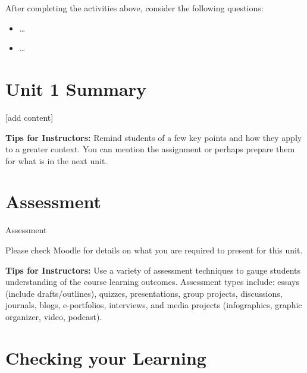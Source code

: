 \documentclass[
]{book}
\providecommand{\tightlist}{%
  \setlength{\itemsep}{0pt}\setlength{\parskip}{0pt}}
\begin{document}
After completing the activities above, consider the following questions:

\begin{itemize}
\tightlist
\item
  \ldots{}\\
\item
  \ldots{}
\end{itemize}

\hypertarget{unit-1-summary}{%
\section*{Unit 1 Summary}\label{unit-1-summary}}

{[}add content{]}

\begin{feedback}
\textbf{Tips for Instructors:}
Remind students of a few key points and how they apply to a greater context. You can mention the assignment or perhaps prepare them for what is in the next unit.
\end{feedback}

\hypertarget{assessment-3}{%
\section*{Assessment}\label{assessment-3}}

\begin{assessment}
{Assessment}

Please check Moodle for details on what you are required to present for this unit.
\end{assessment}

\begin{feedback}
\textbf{Tips for Instructors:}
Use a variety of assessment techniques to gauge students understanding of the course learning outcomes. Assessment types include: essays (include drafts/outlines), quizzes, presentations, group projects, discussions, journals, blogs, e-portfolios, interviews, and media projects (infographics, graphic organizer, video, podcast).
\end{feedback}

\hypertarget{checking-your-learning-3}{%
\section*{Checking your Learning}\label{checking-your-learning-3}}
\end{document}
